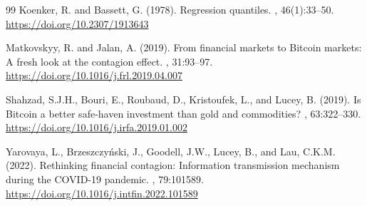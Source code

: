 \documentclass[11pt,a4paper]{article}
\begin{document}
\begin{thebibliography}{99}
Koenker, R. and Bassett, G. (1978).
\newblock Regression quantiles.
, 46(1):33--50.
\newblock \url{https://doi.org/10.2307/1913643}

Matkovskyy, R. and Jalan, A. (2019).
\newblock From financial markets to Bitcoin markets: A fresh look at the contagion effect.
, 31:93--97.
\newblock \url{https://doi.org/10.1016/j.frl.2019.04.007}

Shahzad, S.J.H., Bouri, E., Roubaud, D., Kristoufek, L., and Lucey, B. (2019).
\newblock Is Bitcoin a better safe-haven investment than gold and commodities?
, 63:322--330.
\newblock \url{https://doi.org/10.1016/j.irfa.2019.01.002}

Yarovaya, L., Brzeszczy\'nski, J., Goodell, J.W., Lucey, B., and Lau, C.K.M. (2022).
\newblock Rethinking financial contagion: Information transmission mechanism during the COVID-19 pandemic.
, 79:101589.
\newblock \url{https://doi.org/10.1016/j.intfin.2022.101589}

\end{thebibliography}
\end{document}
